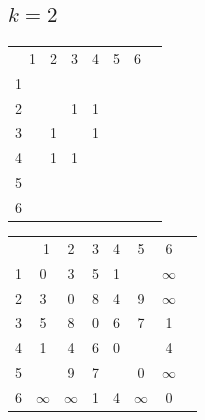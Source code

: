 \documentclass[10pt,a4paper,spanish]{report}
\theoremstyle{definition}
\theoremstyle{remark}
\begin{document}
\subsection{$k=2$}
\begin{minipage}{0.5\textwidth}
\begin{center}
\begin{tabular}{c|c|c|c|c|c|c|c|}
\multicolumn{2}{r}{1} & \multicolumn{1}{c}{2} & \multicolumn{1}{c}{3} & \multicolumn{1}{c}{4} & \multicolumn{1}{c}{5} & \multicolumn{1}{c}{6} \\ 
\cline{2-7}
1 & & & & &\cellcolor{Black}{\textcolor{White}{2}}& \\
\cline{2-7} 
2 & & & 1 & 1 & & \\
\cline{2-7} 
3 & & 1 & & 1 & & \\
\cline{2-7} 
4 & & 1 & 1 & &\cellcolor{Black}{\textcolor{White}{2}}& \\
\cline{2-7} 
5 &\cellcolor{Black}{\textcolor{White}{2}}& & &\cellcolor{Black}{\textcolor{White}{2}}& & \\
\cline{2-7} 
6 & & & & & & \\
\cline{2-7} 
\end{tabular}
\end{center}
\end{minipage}
\begin{minipage}{0.5\textwidth}
\begin{center}
\begin{tabular}{c|c|c|c|c|c|c|c|}
\multicolumn{2}{r}{1} & \multicolumn{1}{c}{2} & \multicolumn{1}{c}{3} & \multicolumn{1}{c}{4} & \multicolumn{1}{c}{5} & \multicolumn{1}{c}{6} \\ 
\cline{2-7}
1 & 0 & 3 & 5 & 1 & \cellcolor{Black}{\textcolor{White}{12}} & $\infty$ \\
\cline{2-7} 
2 & 3 & 0 & 8 & 4 & 9 & $\infty$ \\
\cline{2-7} 
3 & 5 & 8 & 0 & 6 & 7 & 1 \\
\cline{2-7} 
4 & 1 & 4 & 6 & 0 & \cellcolor{Black}{\textcolor{White}{13}} & 4 \\
\cline{2-7} 
5 & \cellcolor{Black}{\textcolor{White}{12}} & 9 & 7 & \cellcolor{Black}{\textcolor{White}{13}} & 0 & $\infty$ \\
\cline{2-7} 
6 & $\infty$ & $\infty$ & 1 & 4 & $\infty$ & 0 \\
\cline{2-7} 
\end{tabular}
\end{center}
\end{minipage}
\end{document}
